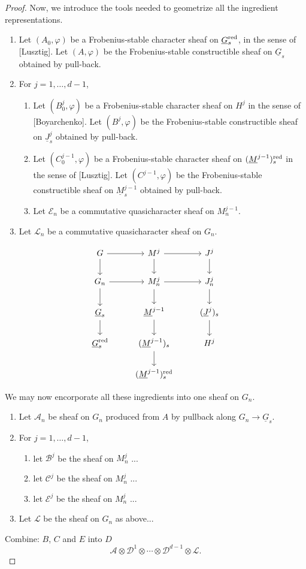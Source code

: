\documentclass[10pt]{amsart}
\theoremstyle{plain}
\theoremstyle{definition}
\newcommand{\cs}[1]{{\mathcal{#1}}}
\begin{document}
\begin{proof}
Now, we introduce the tools needed to geometrize all the ingredient representations.
\begin{enumerate}
\item
Let $(A_0,\varphi)$ be a Frobenius-stable character sheaf on $\underline{G}_s^{\operatorname{red}}$, in the sense of [Lusztig].
Let $(A,\varphi)$ be the Frobenius-stable constructible sheaf on $\underline{G}_s$ obtained by pull-back.
\item For $j=1,\ldots, d-1$, 
\begin{enumerate}
\item
Let $(B_0^{j},\varphi)$ be a Frobenius-stable character sheaf on $H^j$ in the sense of [Boyarchenko].
Let $(B^{j},\varphi)$ be the Frobenius-stable constructible sheaf on $\underline{J}^j_s$ obtained by pull-back.
\item
Let $(C_0^{j-1},\varphi)$ be a Frobenius-stable character sheaf on $(\underline{M}^{j-1})_s^{\operatorname{red}}$ in the sense of [Lusztig].
Let $(C^{j-1},\varphi)$ be the Frobenius-stable constructible sheaf on $\underline{M}^{j-1}_s$ obtained by pull-back.
\item
Let $\cs{E}_n$ be a commutative quasicharacter sheaf on $M_n^{j-1}$.
\end{enumerate}
\item
Let $\cs{L}_n$ be a commutative quasicharacter sheaf on $G_n$.
\end{enumerate}
\[
\begin{tikzcd}
G \arrow{r}  \arrow{d}
& M^{j} \arrow{r} \arrow{d}
& J^j \arrow{d} \\
G_n \arrow{r}  \arrow{d}
& M_n^{j} \arrow{r} \arrow{d}
& J_n^j \arrow{d} \\
\underline{G}_s \arrow{d}
& \underline{M}^{j-1} \arrow{d}
& (\underline{J}^j)_s  \arrow{d} \\
\underline{G}_s\red 
& (\underline{M}^{j-1})_s \arrow{d} & H^j \\
& (\underline{M}^{j-1})_s\red 
& 
\end{tikzcd}
\]

We may now encorporate all these ingredients into one sheaf on $G_n$.
\begin{enumerate}
\item
Let $\cs{A}_n$ be sheaf on $G_n$ produced from $A$ by pullback along $G_n \to \underline{G}_s$.
\item
For $j=1, \ldots, d-1$,
\begin{enumerate}
\item let $\cs{B}^j$ be the sheaf on $M^j_n$ ...
\item let $\cs{C}^j$ be the sheaf on $M^j_n$ ...
\item let $\cs{E}^j$ be the sheaf on $M^j_n$ ...
\end{enumerate}
\item Let $\cs{L}$ be the sheaf on $G_n$ as above...
\end{enumerate}
Combine: $B$, $C$ and $E$ into $D$
\[
\cs{A} \otimes \cs{D}^1 \otimes \cdots \otimes \cs{D}^{d-1} \otimes \cs{L}.
\]


\end{proof}
\end{document}
